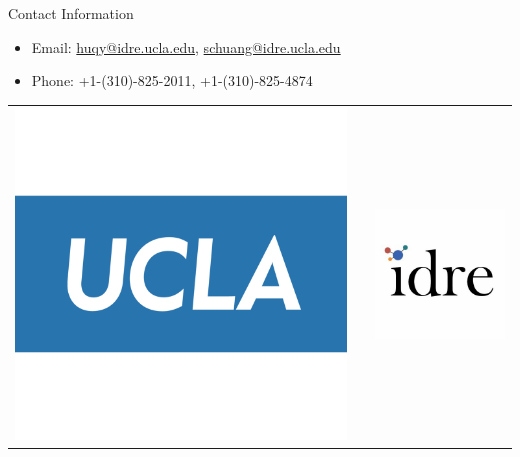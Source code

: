 \documentclass[final]{beamer}
\newlength{\onecolwid}
\begin{document}
\begin{frame}[t]
\begin{columns}[t]
\begin{column}{\onecolwid}


\begin{alertblock}{Contact Information}

\begin{itemize}
\item Email: \href{mailto:huqy@idre.ucla.edu}{huqy@idre.ucla.edu}, \href{mailto:schuang@idre.ucla.edu}{schuang@idre.ucla.edu}
\item Phone: +1-(310)-825-2011, +1-(310)-825-4874
\end{itemize}

\end{alertblock}

\begin{center}
\begin{tabular}{ccc}
\includegraphics[width=0.4\linewidth]{figures/ucla_logo.jpg} & \hfill & \includegraphics[width=0.4\linewidth]{figures/idre_logo.jpg}
\end{tabular}
\end{center}

\end{column} %


\end{columns} %

\end{frame} %
\end{document}
